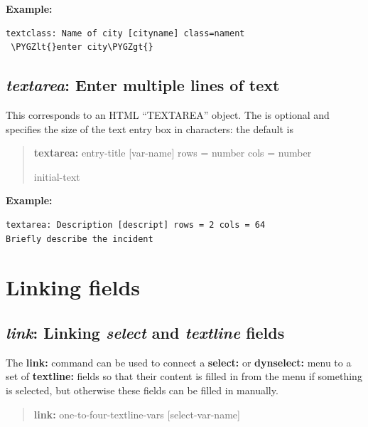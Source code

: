 \documentclass[letterpaper,10pt,english]{sphinxmanual}
\def\PYGZlt{\char`\<}
\def\PYGZgt{\char`\>}
\begin{document}
\textbf{Example:}

\begin{Verbatim}[commandchars=\\\{\}]
textclass: Name of city [cityname] class=nament
 \PYGZlt{}enter city\PYGZgt{}
\end{Verbatim}


\subsection{\emph{textarea}: Enter multiple lines of text}
\label{forms:textarea-enter-multiple-lines-of-text}
This corresponds to an HTML “TEXTAREA” object. The
 is optional and specifies the size of
the text entry box in characters: the default is 
\begin{quote}

\begin{DUlineblock}{0em}
\item[] \textbf{textarea:} entry-title {[}var-name{]} rows = number cols = number
\item[] initial-text
\end{DUlineblock}
\end{quote}

\textbf{Example:}

\begin{Verbatim}[commandchars=\\\{\}]
textarea: Description [descript] rows = 2 cols = 64
Briefly describe the incident
\end{Verbatim}


\section{Linking fields}
\label{forms:linking-fields}

\subsection{\emph{link}: Linking \emph{select} and \emph{textline} fields}
\label{forms:link-linking-select-and-textline-fields}
The \textbf{link:} command can be used to connect a \textbf{select:} or \textbf{dynselect:} menu to a set of \textbf{textline:}
fields so that their content is filled in from the menu if something is selected, but otherwise these
fields can be filled in manually.
\begin{quote}

\begin{DUlineblock}{0em}
\item[] \textbf{link:} one-to-four-textline-vars {[}select-var-name{]}
\end{DUlineblock}
\end{quote}
\end{document}
